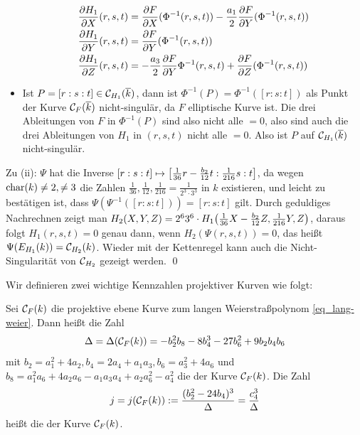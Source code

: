 \begin{bew}
\begin{itemize}
\begin{equation}
\begin{aligned}
			\frac{\partial H_1}{\partial X}(r,s,t) &= \frac{\partial F}{\partial X}(\Phi^{-1}(r,s,t)) - \frac{a_1}{2} \frac{\partial F}{\partial Y}(\Phi^{-1}(r,s,t)) \\
			\frac{\partial H_1}{\partial Y}(r,s,t) &= \frac{\partial F}{\partial Y} (\Phi^{-1}(r,s,t)) \\
			\frac{\partial H_1}{\partial Z}(r,s,t) &= -\frac{a_3}{2} \frac{\partial F}{\partial Y} \Phi^{-1}(r,s,t) + \frac{\partial F}{\partial Z}(\Phi^{-1}(r,s,t))
		\end{aligned}
		\end{equation}
		\item Ist $P = [r:s:t] \in \mathcal{C}_{H_1}(\overline{k})$, dann ist $\Phi^{-1}(P) = \Phi^{-1}([r:s:t])$ als Punkt der Kurve $\mathcal{C}_F(\overline{k})$ nicht-singulär, da $F$ elliptische Kurve ist. 
		Die drei Ableitungen von $F$ in $\Phi^{-1}(P)$ sind also nicht alle $= 0$, also sind auch die drei Ableitungen von $H_1$ in $(r,s,t)$ nicht alle $=0$. 
		Also ist $P$ auf $\mathcal{C}_{H_1}(\overline{k})$ nicht-singulär.
	\end{itemize}
	Zu (ii): $\Psi$ hat die Inverse $[r:s:t] \mapsto \left\lbrack\frac{1}{36} r - \frac{b_2}{12}t : \frac{1}{216} s : t\right\rbrack$, da wegen $\operatorname{char}(k) \neq 2, \neq 3$ die Zahlen $\frac{1}{36}, \frac{1}{12}, \frac{1}{216} = \frac{1}{2^3 \cdot 3^3}$ in $k$ existieren, und leicht zu bestätigen ist, dass $\Psi(\Psi^{-1}([r:s:t])) = [r:s:t]$ gilt. 
	Durch geduldiges Nachrechnen zeigt man $H_2(X,Y,Z) = 2^6 3^6 \cdot H_1 \enb{\frac{1}{36} X - \frac{b_2}{12}Z, \frac{1}{216} Y,Z}$, daraus folgt $H_1(r,s,t) = 0$ genau dann, wenn $H_2(\Psi(r,s,t))=0$, das heißt $\Psi(E_{H_1}(k)) = \mathcal{C}_{H_2}(k)$. 
	Wieder mit der Kettenregel kann auch die Nicht-Singularität von $\mathcal{C}_{H_2}$ gezeigt werden. \qed
\end{bew}

Wir definieren zwei wichtige Kennzahlen projektiver Kurven wie folgt:
\begin{defn}
	Sei $\mathcal{C}_F(k)$ die projektive ebene Kurve zum langen Weierstraßpolynom \eqref{eq_lang-weier}. 
	Dann heißt die Zahl
	\[ 
	\Delta = \Delta(\mathcal{C}_F(k)) = -b_2^2 b_8 - 8b_4^3 - 27b_6^2 + 9b_2b_4b_6
	\]
	mit $b_2 = a_1^2 + 4a_2, b_4 = 2a_4 + a_1 a_3, b_6 = a_3^2 + 4a_6$ und $b_8 = a_1^2 a_6 + 4a_2 a_6 - a_1a_3a_4 + a_2 a_6^2 - a_4^2$ die  der Kurve $\mathcal{C}_F(k)$. 
	Die Zahl 
	\[ j = j(\mathcal{C}_F(k)) := \frac{(b_2^2 - 24b_4)^3}{\Delta} = \frac{c_4^3}{\Delta} \]
	heißt die  der Kurve $\mathcal{C}_F(k)$. 
\end{defn}

